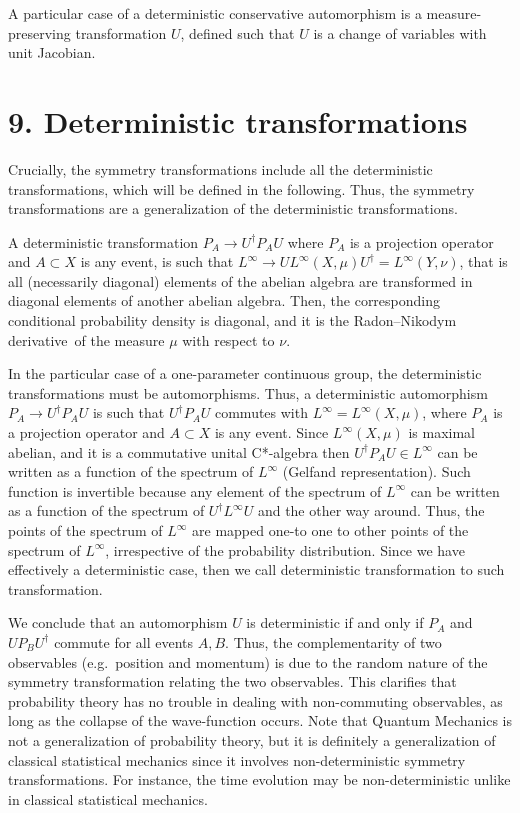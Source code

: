 \documentclass[11pt]{book}
\begin{document}
A particular case of a deterministic conservative automorphism is a
measure-preserving transformation \(U\), defined such that \(U\) is a
change of variables with unit Jacobian.

\hypertarget{deterministic-transformations}{%
\section{9. Deterministic
transformations}\label{deterministic-transformations}}

Crucially, the symmetry transformations include all the deterministic
transformations, which will be defined in the following. Thus, the
symmetry transformations are a generalization of the deterministic
transformations.

A deterministic transformation \(P_A\to U^\dagger P_A U\) where \(P_A\)
is a projection operator and \(A\subset X\) is any event, is such that
\(L^\infty\to U L^\infty(X,\mu)U^\dagger=L^\infty(Y,\nu)\), that is all
(necessarily diagonal) elements of the abelian algebra are transformed
in diagonal elements of another abelian algebra. Then, the corresponding
conditional probability density is diagonal, and it is the
Radon--Nikodym derivative~of the measure \(\mu\) with respect to
\(\nu\)\cite{takesaki2012theory}.

In the particular case of a one-parameter continuous group, the
deterministic transformations must be automorphisms. Thus, a
deterministic automorphism \(P_A\to U^\dagger P_A U\) is such that
\(U^\dagger P_A U\) commutes with \(L^\infty=L^\infty(X,\mu)\), where
\(P_A\) is a projection operator and \(A\subset X\) is any event. Since
\(L^\infty(X,\mu)\) is maximal abelian, and it is a commutative unital
C*-algebra\cite{Blecher_2022} then \(U^\dagger P_A U\in L^\infty\) can be written
as a function of the spectrum of \(L^\infty\) (Gelfand representation).
Such function is invertible because any element of the spectrum of
\(L^\infty\) can be written as a function of the spectrum of
\(U^\dagger L^\infty U\) and the other way around. Thus, the points of
the spectrum of \(L^\infty\) are mapped one-to one to other points of
the spectrum of \(L^\infty\), irrespective of the probability
distribution. Since we have effectively a deterministic case, then we
call deterministic transformation to such transformation.

We conclude that an automorphism \(U\) is deterministic if and only if
\(P_A\) and \(U P_B U^\dagger\) commute for all events \(A, B\). Thus,
the complementarity of two observables (e.g.~position and momentum) is
due to the random nature of the symmetry transformation relating the two
observables. This clarifies that probability theory has no trouble in
dealing with non-commuting observables, as long as the collapse of the
wave-function occurs. Note that Quantum Mechanics is not a
generalization of probability theory, but it is definitely a
generalization of classical statistical mechanics since it involves
non-deterministic symmetry transformations. For instance, the time
evolution may be non-deterministic unlike in classical statistical
mechanics.
\end{document}
